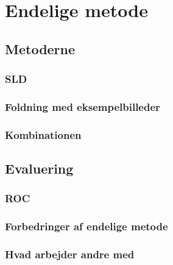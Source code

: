 \section{Endelige metode}
\subsection{Metoderne}
\subsubsection{SLD}	%
\subsubsection{Foldning med eksempelbilleder} %
\subsubsection{Kombinationen} %
\subsection{Evaluering}
\subsubsection{ROC}
\subsubsection{Forbedringer af endelige metode}
\subsubsection{Hvad arbejder andre med} %